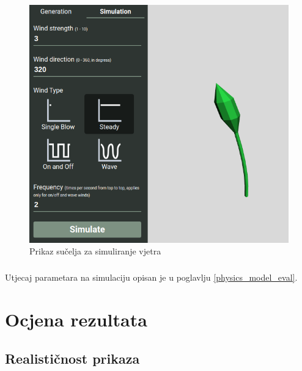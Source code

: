 \documentclass[times, utf8, diplomski]{fer}
\begin{document}
\begin{figure}[h]
	\centering
	\includegraphics[width=1\textwidth]{img/43-4}
	\caption{Prikaz sučelja za simuliranje vjetra}
	\label{fig:43-4}
\end{figure}

\paragraph{}
Utjecaj parametara na simulaciju opisan je u poglavlju \ref{physics_model_eval}.

\chapter{Ocjena rezultata}
\section{Realističnost prikaza}
\end{document}
